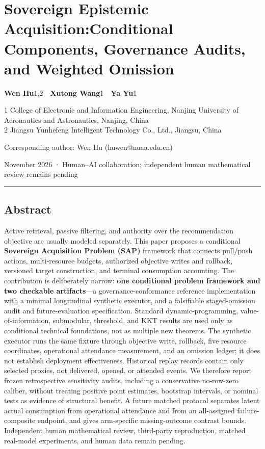 \documentclass[
  11pt]{article}
\author{}
\date{19 November 2026}
\begin{document}
\section{\texorpdfstring{Sovereign Epistemic
Acquisition:\newline Conditional Components, Governance Audits, and
Weighted
Omission}{Sovereign Epistemic Acquisition:Conditional Components, Governance Audits, and Weighted Omission}}\label{sovereign-epistemic-acquisitionconditional-components-governance-audits-and-weighted-omission}

\textbf{Wen Hu}1,2~~\textbf{Xutong Wang}1~~\textbf{Ya Yu}1

1 College of Electronic and Information Engineering, Nanjing University
of Aeronautics and Astronautics, Nanjing, China\\
2 Jiangsu Yunhefeng Intelligent Technology Co., Ltd., Jiangsu, China

Corresponding author: Wen Hu (huwen@nuaa.edu.cn)

November 2026 · Human--AI collaboration; independent human mathematical
review remains pending

\begin{center}\rule{0.5\linewidth}{0.5pt}\end{center}

\subsection{Abstract}\label{abstract}

Active retrieval, passive filtering, and authority over the
recommendation objective are usually modeled separately. This paper
proposes a conditional \textbf{Sovereign Acquisition Problem (SAP)}
framework that connects pull/push actions, multi-resource budgets,
authorized objective writes and rollback, versioned target construction,
and terminal consumption accounting. The contribution is deliberately
narrow: \textbf{one conditional problem framework and two checkable
artifacts}---a governance-conformance reference implementation with a
minimal longitudinal synthetic executor, and a falsifiable
staged-omission audit and future-evaluation specification. Standard
dynamic-programming, value-of-information, submodular, threshold, and
KKT results are used only as conditional technical foundations, not as
multiple new theorems. The synthetic executor runs the same fixture
through objective write, rollback, five resource coordinates,
operational attendance measurement, and an omission ledger; it does not
establish deployment effectiveness. Historical replay records contain
only selected proxies, not delivered, opened, or attended events. We
therefore report frozen retrospective sensitivity audits, including a
conservative no-row-zero caliber, without treating positive point
estimates, bootstrap intervals, or nominal tests as evidence of
structural benefit. A future matched protocol separates latent actual
consumption from operational attendance and from an all-assigned
failure-composite endpoint, and gives arm-specific missing-outcome
contrast bounds. Independent human mathematical review, third-party
reproduction, matched real-model experiments, and human data remain
pending.
\end{document}
